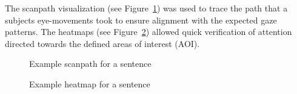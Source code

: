\documentclass[
  12pt,
  letterpaper,
  DIV=11,
  numbers=noendperiod]{scrreprt}
\begin{document}
The scanpath visualization (see Figure~\ref{fig-scanpath}) was used to
trace the path that a subjects eye-movements took to ensure alignment
with the expected gaze patterns. The heatmaps (see
Figure~\ref{fig-heatmap}) allowed quick verification of attention
directed towards the defined areas of interest (AOI).

\begin{figure}


\caption{\label{fig-scanpath}Example scanpath for a sentence}

\end{figure}%

\begin{figure}


\caption{\label{fig-heatmap}Example heatmap for a sentence}

\end{figure}%
\end{document}
